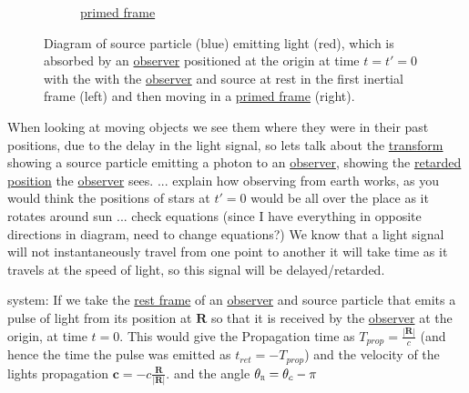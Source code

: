 \begin{figure}[ht]
\begin{subfigure}[b]{.49\textwidth}
\caption{\hyperlink{def-Primed-Frame}{primed frame}}
\end{subfigure}
\caption{ Diagram of source particle (blue) emitting light (red), which is absorbed by an \protect\hyperlink{def-observer}{observer} positioned at the origin at time $t=t'=0$ with the with the \protect\hyperlink{def-observer}{observer} and source at rest in the first inertial frame (left) and then moving in a \protect\hyperlink{def-Primed-Frame}{primed frame} (right).}
\label{fig: Retarded field}
\end{figure}
When looking at moving objects we see them where they were in their past positions, due to the delay in the light signal, so lets talk about the \hyperlink{def-transform}{transform} showing a source particle emitting a photon to an \hyperlink{def-observer}{observer}, showing the \hyperlink{def-retarded-position}{retarded position}  the \hyperlink{def-observer}{observer} sees.
... explain how observing from earth works, as you would think the positions of stars at $t'=0$ would be all over the place as it rotates around sun
... check equations (since I have everything in opposite directions in diagram, need to change equations?)
We know that a light signal will not instantaneously travel from one point to another it will take time as it travels at the speed of light, so this signal will be delayed/retarded.

system:
If we take the \hyperlink{def-proper-frame}{rest frame} of an \hyperlink{def-observer}{observer} and source particle that emits a pulse of light from its position at $\mathbf{R}$ so that it is received by the \hyperlink{def-observer}{observer} at the origin, at time $t=0$. This would give the Propagation time as $T_{prop}= \frac{|\mathbf{R}|}{c}$ (and hence the time the pulse was emitted as $t_{ret}=-T_{prop}$) and the velocity of the lights propagation $\mathbf{c} = -c \frac{\mathbf{R}}{|\mathbf{R}|}$. and the angle $\theta_{\scalebox{0.5}{R}} = \theta_c - \pi$

